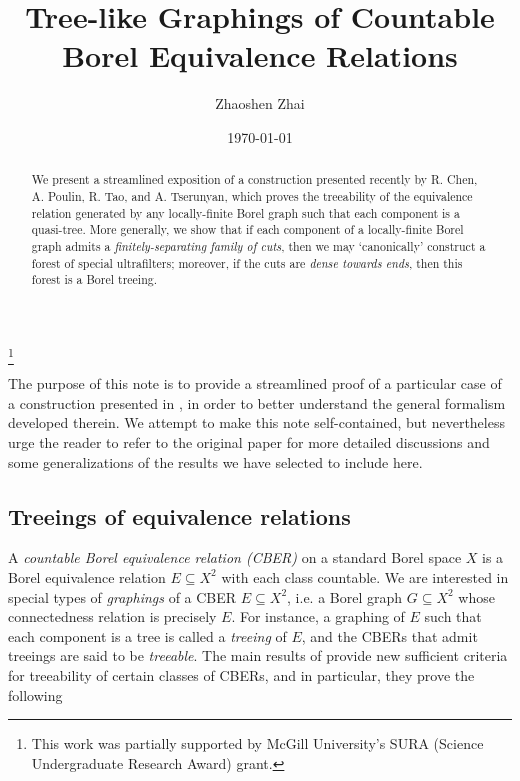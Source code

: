 \documentclass[reqno]{amsart}
\begin{document}
    \title{Tree-like Graphings of Countable Borel Equivalence Relations}
    \author{Zhaoshen Zhai}
    \address{Department of Mathematics and Statistics, McGill University, 805 Sherbrooke Street West, Montreal, QC, H3A 0B9, Canada}
    \thanks{This work was partially supported by McGill University's SURA (Science Undergraduate Research Award) grant.}
    \date{\today}

    \begin{abstract}
        We present a streamlined exposition of a construction presented recently by R. Chen, A. Poulin, R. Tao, and A. Tserunyan, which proves the treeability of the equivalence relation generated by any locally-finite Borel graph such that each component is a quasi-tree. More generally, we show that if each component of a locally-finite Borel graph admits a \textit{finitely-separating family of cuts}, then we may `canonically' construct a forest of special ultrafilters; moreover, if the cuts are \textit{dense towards ends}, then this forest is a Borel treeing.
    \end{abstract}

    \maketitle


    The purpose of this note is to provide a streamlined proof of a particular case of a construction presented in \cite{CPTT23}, in order to better understand the general formalism developed therein. We attempt to make this note self-contained, but nevertheless urge the reader to refer to the original paper for more detailed discussions and some generalizations of the results we have selected to include here.

    \subsection*{Treeings of equivalence relations}

    A \textit{countable Borel equivalence relation (CBER)} on a standard Borel space $X$ is a Borel equivalence relation $E\subseteq X^2$ with each class countable. We are interested in special types of \textit{graphings} of a CBER $E\subseteq X^2$, i.e. a Borel graph $G\subseteq X^2$ whose connectedness relation is precisely $E$. For instance, a graphing of $E$ such that each component is a tree is called a \textit{treeing} of $E$, and the CBERs that admit treeings are said to be \textit{treeable}. The main results of \cite{CPTT23} provide new sufficient criteria for treeability of certain classes of CBERs, and in particular, they prove the following
\end{document}
